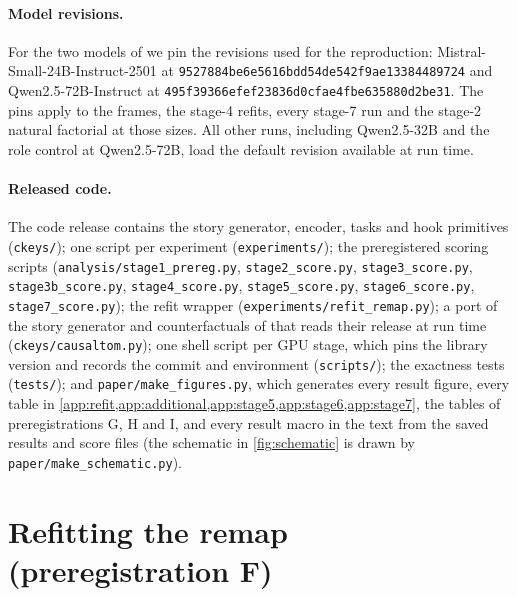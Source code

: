 \paragraph{Model revisions.} For the two models of \citet{anonymous2026fitted} we pin the revisions used for the reproduction: Mistral-Small-24B-Instruct-2501 at \texttt{9527884be6e5616bdd54de542f9ae13384489724} and Qwen2.5-72B-Instruct at \texttt{495f39366efef23836d0cfae4fbe635880d2be31}. The pins apply to the frames, the stage-4 refits, every stage-7 run and the stage-2 natural factorial at those sizes. All other runs, including Qwen2.5-32B and the role control at Qwen2.5-72B, load the default revision available at run time.

\paragraph{Released code.} The code release contains the story generator, encoder, tasks and hook primitives (\texttt{ckeys/}); one script per experiment (\texttt{experiments/}); the preregistered scoring scripts (\texttt{analysis/stage1\_prereg.py}, \texttt{stage2\_score.py}, \texttt{stage3\_score.py}, \texttt{stage3b\_score.py}, \texttt{stage4\_score.py}, \texttt{stage5\_score.py}, \texttt{stage6\_score.py}, \texttt{stage7\_score.py}); the refit wrapper (\texttt{experiments/refit\_remap.py}); a port of the story generator and counterfactuals of \citet{prakash2025lookbacks} that reads their release at run time (\texttt{ckeys/causaltom.py}); one shell script per GPU stage, which pins the library version and records the commit and environment (\texttt{scripts/}); the exactness tests (\texttt{tests/}); and \texttt{paper/make\_figures.py}, which generates every result figure, every table in \cref{app:refit,app:additional,app:stage5,app:stage6,app:stage7}, the tables of preregistrations G, H and I, and every result macro in the text from the saved results and score files (the schematic in \cref{fig:schematic} is drawn by \texttt{paper/make\_schematic.py}).

\clearpage
\section{Refitting the remap (preregistration F)}\label{app:refit}

